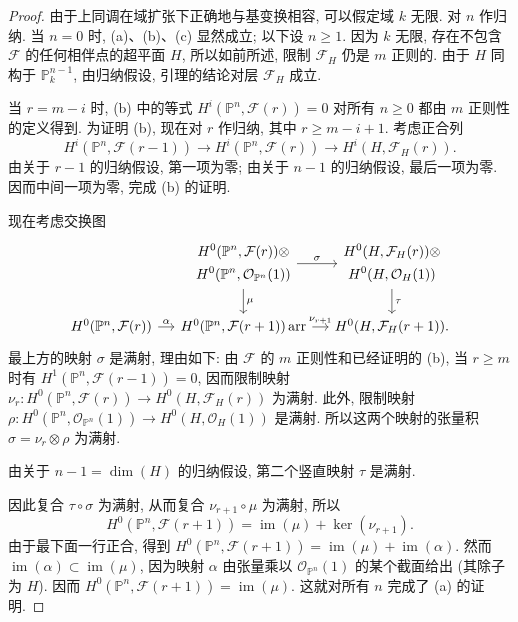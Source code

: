 \begin{proof}
由于上同调在域扩张下正确地与基变换相容, 可以假定域 $k$ 无限. 对 $n$ 作归纳. 当 $n=0$ 时, (a)、(b)、(c) 显然成立; 以下设 $n\geq1$. 因为 $k$ 无限, 存在不包含 $\mathcal F$ 的任何相伴点的超平面 $H$, 所以如前所述, 限制 $\mathcal F_H$ 仍是 $m$ 正则的. 由于 $H$ 同构于 $\mathbb P^{n-1}_k$, 由归纳假设, 引理的结论对层 $\mathcal F_H$ 成立.

当 $r=m-i$ 时, (b) 中的等式 $H^i(\mathbb P^n,\mathcal F(r))=0$ 对所有 $n\geq0$ 都由 $m$ 正则性的定义得到. 为证明 (b), 现在对 $r$ 作归纳, 其中 $r\geq m-i+1$. 考虑正合列
\[
 H^i(\mathbb P^n,\mathcal F(r-1))\longrightarrow H^i(\mathbb P^n,\mathcal F(r))
 \longrightarrow H^i(H,\mathcal F_H(r)).
\]
由关于 $r-1$ 的归纳假设, 第一项为零; 由关于 $n-1$ 的归纳假设, 最后一项为零. 因而中间一项为零, 完成 (b) 的证明.

现在考虑交换图
\[
\begin{tikzcd}[column sep=small]
 &\begin{gathered}H^0(\mathbb P^n,\mathcal F(r))\otimes\\H^0(\mathbb P^n,\mathcal O_{\mathbb P^n}(1))\end{gathered}
 \arrow[r,"\sigma"]\arrow[d,"\mu"]
 &\begin{gathered}H^0(H,\mathcal F_H(r))\otimes\\H^0(H,\mathcal O_H(1))\end{gathered}\arrow[d,"\tau"]\\
 H^0(\mathbb P^n,\mathcal F(r))\arrow[r,"\alpha"]
 &H^0(\mathbb P^n,\mathcal F(r+1))\,\mathrm{arr}\arrow[r,"\nu_{r+1}"]
 &H^0(H,\mathcal F_H(r+1)).
\end{tikzcd}
\]
最上方的映射 $\sigma$ 是满射, 理由如下: 由 $\mathcal F$ 的 $m$ 正则性和已经证明的 (b), 当 $r\geq m$ 时有 $H^1(\mathbb P^n,\mathcal F(r-1))=0$, 因而限制映射 $\nu_r:H^0(\mathbb P^n,\mathcal F(r))\to H^0(H,\mathcal F_H(r))$ 为满射. 此外, 限制映射 $\rho:H^0(\mathbb P^n,\mathcal O_{\mathbb P^n}(1))\to H^0(H,\mathcal O_H(1))$ 是满射. 所以这两个映射的张量积 $\sigma=\nu_r\otimes\rho$ 为满射.

由关于 $n-1=\dim(H)$ 的归纳假设, 第二个竖直映射 $\tau$ 是满射.

因此复合 $\tau\circ\sigma$ 为满射, 从而复合 $\nu_{r+1}\circ\mu$ 为满射, 所以
\[
 H^0(\mathbb P^n,\mathcal F(r+1))=\operatorname{im}(\mu)+\ker(\nu_{r+1}).
\]
由于最下面一行正合, 得到 $H^0(\mathbb P^n,\mathcal F(r+1))=\operatorname{im}(\mu)+\operatorname{im}(\alpha)$. 然而 $\operatorname{im}(\alpha)\subset\operatorname{im}(\mu)$, 因为映射 $\alpha$ 由张量乘以 $\mathcal O_{\mathbb P^n}(1)$ 的某个截面给出 (其除子为 $H$). 因而 $H^0(\mathbb P^n,\mathcal F(r+1))=\operatorname{im}(\mu)$. 这就对所有 $n$ 完成了 (a) 的证明.


\end{proof}
